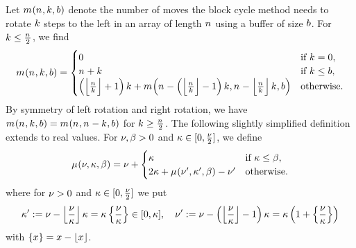   Let $\CostOf{\Size,\Shift,\Buffer}$ denote the number of moves the
  block cycle method needs to rotate $k_{}$ steps to the left in an
  array of length $n_{}$ using a buffer of size $b$.
  For $k_{} \leq \frac{n_{}}{2}$, we find
  \begin{equation}\label{integral}
    \CostOf{\Size,\Shift,\Buffer}
    =
    \begin{cases}
      0 & \text{if\ } \Shift = 0, \\
      \Size+\Shift & \text{if\ } \Shift \leq \Buffer, \\
      \Parentheses{\FloorOf{ \frac{\Size}{\Shift} } + 1} \Shift
      +
      \CostOf{
      \Size - \Parentheses{\FloorOf{\frac{\Size}{\Shift}} - 1} \Shift,
      \Size - \FloorOf{\frac{\Size}{\Shift}} \Shift,
      \Buffer
      }
        & \text{otherwise}.
    \end{cases}
  \end{equation}
  By symmetry of left rotation and right rotation, we have
  \(
    \CostOf{\Size,\Shift,\Buffer} = \CostOf{\Size,\Size-\Shift,\Buffer}
  \)
  for $k_{} \geq \frac{n_{}}{2}$.  The following slightly simplified definition extends to real values. 
  For $\nu, \beta >0$ and
  $\kappa \in [0,\frac{\nu}{2}]$, we define
  \begin{equation}\label{def-mu-nu}
    \SimpleCostOf{ \TheTotal, \TheLength, \BufLength }
    =
    \TheTotal+  \begin{cases}
      \TheLength & \text{if\ } \TheLength \leq \BufLength, \\
      2\TheLength
      +
      \SimpleCostOf{\TheTotal',\TheLength',\BufLength}
      -
      \TheTotal'
                 & \text{otherwise}.
    \end{cases}
  \end{equation}
  where for $\nu>0$ and $\kappa\in[0,\frac{\nu}{2}]$ we put
  \[
    \TheLength'
    := \TheTotal - \FloorOf{\frac{\TheTotal}{\TheLength} } \TheLength
    =
    \TheLength\GaussOf{\frac{\TheTotal}{\TheLength}}
    \in[0, \TheLength], \quad 
    \TheTotal'
    := \TheTotal -
    \Parentheses{ \FloorOf{ \frac{\TheTotal}{\TheLength} } - 1 } \TheLength
    =
    \TheLength\Parentheses{1+\GaussOf{\frac{\TheTotal}{\TheLength}}}
  \]
  with 
  $\GaussOf{\TheVariable}=\TheVariable-\FloorOf{\TheVariable}$. 
